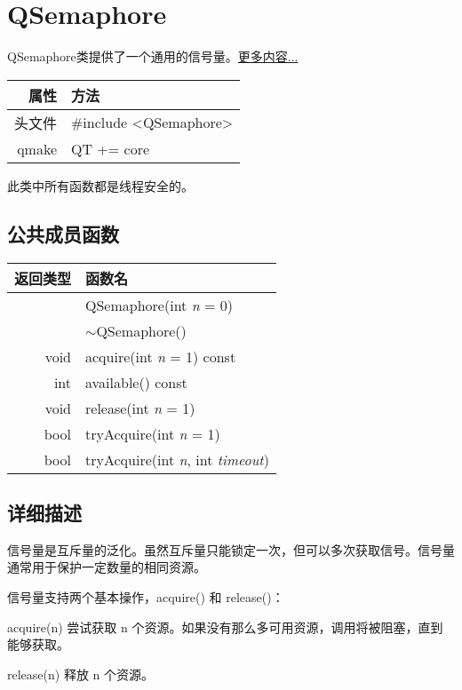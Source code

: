 \chapter{QSemaphore}

QSemaphore类提供了一个通用的信号量。\href{}{更多内容...}

\begin{tabular}{|r|l|}
	\hline
	属性 & 方法 \\
	\hline
	头文件 & \#include <QSemaphore>\\      
	\hline
	qmake & QT += core\\      
	\hline
\end{tabular}

\begin{warning}
此类中所有函数都是线程安全的。
\end{warning}

\section{公共成员函数}

\begin{tabular}{|r|l|}
	\hline 
	返回类型	& 函数名 \\ 
	\hline 
	& QSemaphore(int \emph{n} = 0) \\ 
	\hline
	& $\sim$QSemaphore() \\
	\hline
	void	& acquire(int \emph{n} = 1) const \\ 
	\hline
	int	& available() const \\ 
	\hline
	void &	release(int \emph{n} = 1) \\
	\hline
	bool &	tryAcquire(int \emph{n} = 1) \\ 
	\hline 
	bool	&tryAcquire(int \emph{n}, int \emph{timeout}) \\ 
	\hline
\end{tabular}


\section{详细描述}

信号量是互斥量的泛化。虽然互斥量只能锁定一次，但可以多次获取信号。信号量通常用于保护一定数量的相同资源。

信号量支持两个基本操作，acquire() 和 release()：

\begin{compactitem}[\arr]
\item acquire(n) 尝试获取 n 个资源。如果没有那么多可用资源，调用将被阻塞，直到能够获取。
\item release(n) 释放 n 个资源。
\end{compactitem}

